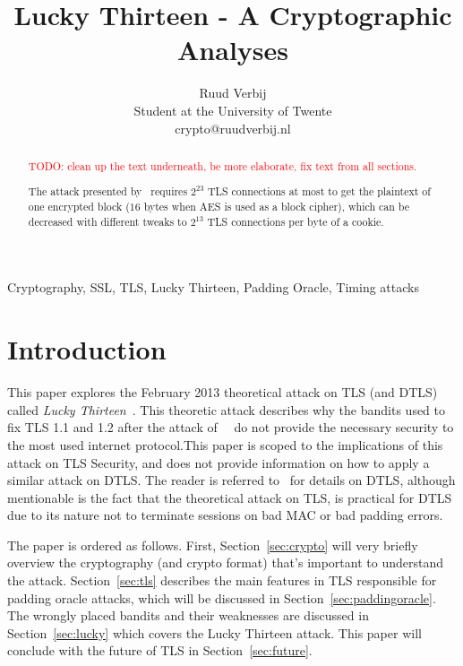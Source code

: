 \documentclass[10pt,conference,a4paper]{IEEEtran}
\title{Lucky Thirteen - A Cryptographic Analyses}
\author{Ruud Verbij \\ Student at the University of Twente \\ crypto@ruudverbij.nl}
\begin{document}
\maketitle



\begin{abstract}
\textcolor{red}{TODO: clean up the text underneath, be more elaborate, fix text from all sections.}

The attack presented by~\citeauthor{alfardan2013lucky} requires $2^{23}$ TLS connections at most to get the plaintext of one encrypted block ($16$ bytes when AES is used as a block cipher), which can be decreased with different tweaks to $2^{13}$ TLS connections per byte of a cookie.

\end{abstract}



\begin{IEEEkeywords}
Cryptography, SSL, TLS, Lucky Thirteen, Padding Oracle, Timing attacks
\end{IEEEkeywords}



\section{Introduction}
\label{sec:intro}
This paper explores the February 2013 theoretical attack on TLS (and DTLS) called \textit{Lucky Thirteen}~\cite{alfardan2013lucky}. This theoretic attack describes why the bandits used to fix TLS 1.1 and 1.2 after the attack of~\citeauthor{canvel2003password}~\cite{canvel2003password} do not provide the necessary security to the most used internet protocol.This paper is scoped to the implications of this attack on TLS Security, and does not provide information on how to apply a similar attack on DTLS. The reader is referred to~\cite{alfardan2013lucky} for details on DTLS, although mentionable is the fact that the theoretical attack on TLS, is practical for DTLS due to its nature not to terminate sessions on bad MAC or bad padding errors.

The paper is ordered as follows. First, Section~\ref{sec:crypto} will very briefly overview the cryptography (and crypto format) that's important to understand the attack. Section~\ref{sec:tls} describes the main features in TLS responsible for padding oracle attacks, which will be discussed in Section~\ref{sec:paddingoracle}. The wrongly placed bandits and their weaknesses are discussed in Section~\ref{sec:lucky} which covers the Lucky Thirteen attack. This paper will conclude with the future of TLS in Section~\ref{sec:future}.
\end{document}
